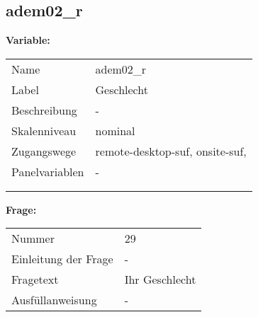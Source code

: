 	
	
	\subsection{adem02\_r}
	\label{subSection:adem02_r}

	\noindent\textbf{Variable:}\\
		\begin{tabular}{lL{11.3cm}}
			\label{tableVariable:adem02_r}
			Name & adem02\_r \\
			Label & Geschlecht \\
			Beschreibung & - \\
			Skalenniveau & nominal \\
			Zugangswege &
				remote-desktop-suf,
				onsite-suf,
 \\
			Panelvariablen & -
			 \\
			 \\
 \\
		\end{tabular}

		\vspace*{1 cm}
		\noindent\textbf{Frage:}\\
		\begin{tabular}{lL{11.3cm}}
			\label{tableQuestion:adem02_r}
			Nummer & 29 \\
			Einleitung der Frage & - \\
			Fragetext & Ihr Geschlecht \\
			Ausfüllanweisung & - \\
		\end{tabular}





